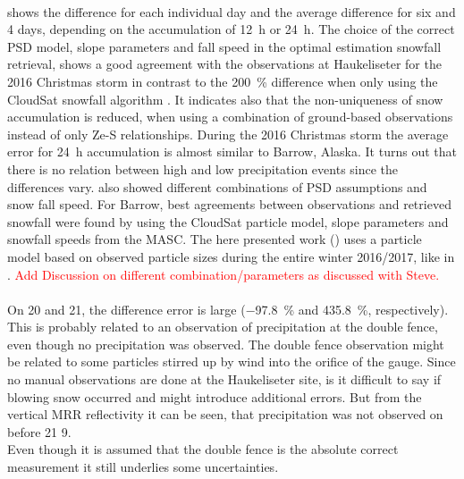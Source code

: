 \\
 shows the difference for each individual day and the average difference for six and 4 days, depending on the accumulation of \SI{12}{\hour} or \SI{24}{\hour}.
The choice of the correct PSD model, slope parameters and fall speed in the optimal estimation snowfall retrieval, shows a good agreement with the observations at Haukeliseter for the 2016 Christmas storm in contrast to the \SI{200}{\percent} difference when only using the CloudSat snowfall algorithm . It indicates also that the non-uniqueness of snow accumulation is reduced, when using a combination of ground-based observations instead of only Ze-S relationships. 
During the 2016 Christmas storm the average error for \SI{24}{\hour} accumulation is almost similar to Barrow, Alaska. It turns out that there is no relation between high and low precipitation events since the differences vary. \citet{cooper_variational_2017} also showed different combinations of PSD assumptions and snow fall speed. For Barrow, best agreements between observations and retrieved snowfall were found by using the CloudSat particle model, slope parameters and snowfall speeds from the MASC. The here presented work () uses a particle model based on observed particle sizes during the entire winter 2016/2017, like in . \textcolor{red}{Add Discussion on different combination/parameters as discussed with Steve. }
\\
\\
On \num{20} and \SI{21}{\dec}, the difference error is large (\SI{-97.8}{\percent} and \SI{435.8}{\percent}, respectively). This is probably related to an observation of precipitation at the double fence, even though no precipitation was observed. The double fence observation might be related to some particles stirred up by wind into the orifice of the gauge. Since no manual observations are done at the Haukeliseter site, is it difficult to say if blowing snow occurred and might introduce additional errors. But from the vertical MRR reflectivity it can be seen, that precipitation was not observed on before \SI{21}{\dec} \SI{9}{\UTC}.
\\
Even though it is assumed that the double fence is the absolute correct measurement it still underlies some uncertainties. 
